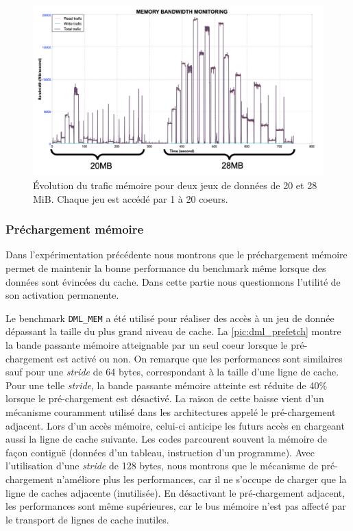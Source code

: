         \begin{figure}
        \center
        \includegraphics[width=14cm]{images/dml_bw_cacheL3.png}
        \caption{\label{pic:dml_bw_cacheL3} Évolution du trafic mémoire pour deux jeux de données de 20 et 28 MiB. Chaque jeu est accédé par 1 à 20 coeurs.}
        \end{figure}
        
        

    \subsubsection{Préchargement mémoire}
        
        Dans l'expérimentation précédente nous montrons que le préchargement mémoire permet de maintenir la bonne performance du benchmark même lorsque des données sont évincées du cache. Dans cette partie nous questionnons l'utilité de son activation permanente. 
        
        Le benchmark \verb=DML_MEM= a été utilisé pour réaliser des accès à un jeu de donnée dépassant la taille du plus grand niveau de cache. La \autoref{pic:dml_prefetch} montre la bande passante mémoire atteignable par un seul coeur lorsque le pré-chargement est activé ou non. On remarque que les performances sont similaires sauf pour une \textit{stride} de 64 bytes, correspondant à la taille d'une ligne de cache. Pour une telle \textit{stride}, la bande passante mémoire atteinte est réduite de 40\% lorsque le pré-chargement est désactivé.
        La raison de cette baisse vient d'un mécanisme couramment utilisé dans les architectures appelé le pré-chargement adjacent. Lors d'un accès mémoire, celui-ci anticipe les futurs accès en chargeant aussi la ligne de cache suivante. Les codes parcourent souvent la mémoire de façon contiguë (données d'un tableau, instruction d'un programme). Avec l'utilisation d'une \textit{stride} de 128 bytes, nous montrons que le mécanisme de pré-chargement n'améliore plus les performances, car il ne s'occupe de charger que la ligne de caches adjacente (inutilisée). En désactivant le pré-chargement adjacent, les performances sont même supérieures, car le bus mémoire n'est pas affecté par le transport de lignes de cache inutiles.
        
